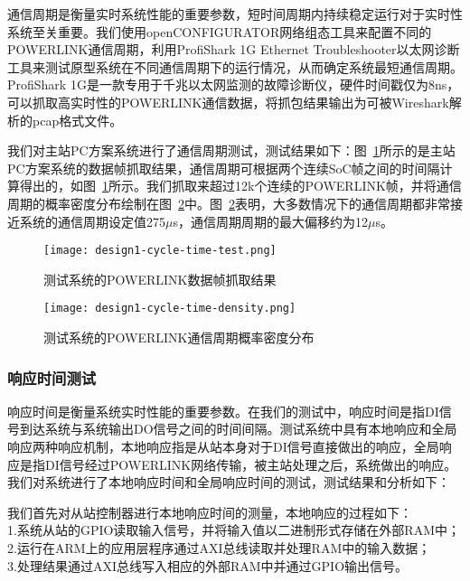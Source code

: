 通信周期是衡量实时系统性能的重要参数，短时间周期内持续稳定运行对于实时性系统至关重要。我们使用openCONFIGURATOR网络组态工具来配置不同的POWERLINK通信周期，利用ProfiShark 1G Ethernet Troubleshooter以太网诊断工具来测试原型系统在不同通信周期下的运行情况，从而确定系统最短通信周期。ProfiShark 1G是一款专用于千兆以太网监测的故障诊断仪，硬件时间戳仅为8ns，可以抓取高实时性的POWERLINK通信数据，将抓包结果输出为可被Wireshark解析的pcap格式文件。

我们对主站PC方案系统进行了通信周期测试，测试结果如下：图~\ref{fig:design1-cycle-time-test}所示的是主站PC方案系统的数据帧抓取结果，通信周期可根据两个连续SoC帧之间的时间隔计算得出的，如图~\ref{fig:design1-cycle-time-test}所示。我们抓取来超过12k个连续的POWERLINK帧，并将通信周期的概率密度分布绘制在图~\ref{fig:design1-cycle-time-density}中。图~\ref{fig:design1-cycle-time-density}表明，大多数情况下的通信周期都非常接近系统的通信周期设定值275$\mu$s，通信周期周期的最大偏移约为12$\mu$s。

\begin{figure}[!htb]
  \centering
  \texttt{[image: design1-cycle-time-test.png]}
  \caption{测试系统的POWERLINK数据帧抓取结果}
  \label{fig:design1-cycle-time-test}
\end{figure}

\begin{figure}[!htb]
  \centering
  \texttt{[image: design1-cycle-time-density.png]}
  \caption{测试系统的POWERLINK通信周期概率密度分布}
  \label{fig:design1-cycle-time-density}
\end{figure}


\subsubsection{响应时间测试}
响应时间是衡量系统实时性能的重要参数。在我们的测试中，响应时间是指DI信号到达系统与系统输出DO信号之间的时间间隔。测试系统中具有本地响应和全局响应两种响应机制，本地响应指是从站本身对于DI信号直接做出的响应，全局响应是指DI信号经过POWERLINK网络传输，被主站处理之后，系统做出的响应。我们对系统进行了本地响应时间和全局响应时间的测试，测试结果和分析如下：

我们首先对从站控制器进行本地响应时间的测量，本地响应的过程如下：\\
1.系统从站的GPIO读取输入信号，并将输入值以二进制形式存储在外部RAM中；\\
2.运行在ARM上的应用层程序通过AXI总线读取并处理RAM中的输入数据；\\
3.处理结果通过AXI总线写入相应的外部RAM中并通过GPIO输出信号。

